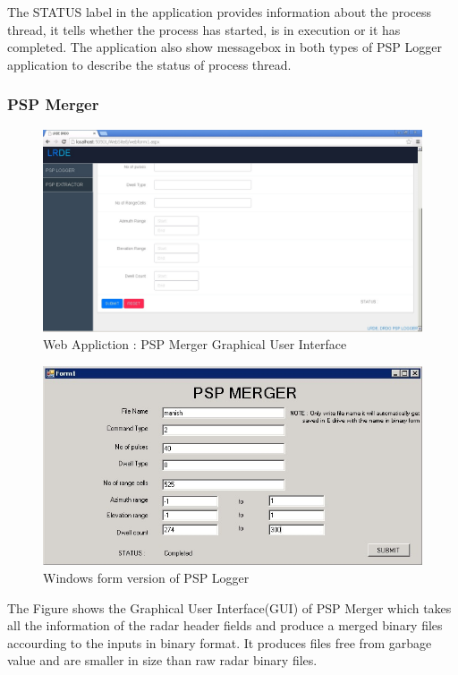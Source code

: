 \documentclass[14pt]{article} %
\begin{document}
 \begin{tcolorbox}[title = NOTE]
The STATUS label in the application provides information about the process thread, it tells whether the process has started, is in execution or it has completed. The application also show messagebox in both types of PSP Logger application to describe the status of process thread.
 \end{tcolorbox}
  \subsubsection{PSP Merger}
    \begin{figure}[H]
\includegraphics[width=\linewidth]{extractor2.jpg}
  \caption{Web Appliction : PSP Merger Graphical User Interface}
  \label{fig:figure 26}
\end{figure}  
 \begin{figure}[H]
\includegraphics[width=\linewidth]{PSPmerger.jpg}
  \caption{Windows form version of PSP Logger}
  \label{fig:figure 27}
  \end{figure}
 The Figure shows the Graphical User Interface(GUI) of PSP Merger which takes all the information of the radar header fields and produce a merged binary files accourding to the inputs  in binary format. It produces files free from garbage value and are smaller in size than raw radar binary files.
\end{document}
